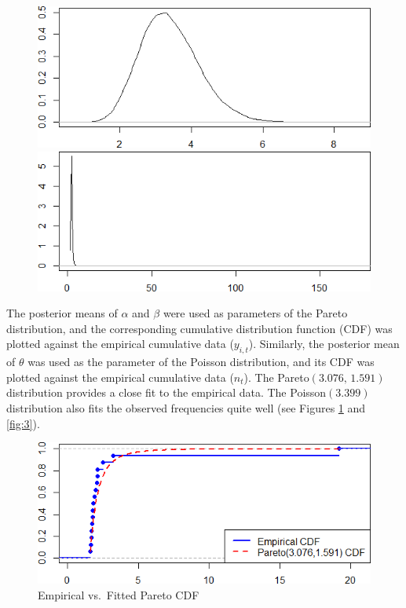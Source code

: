 \documentclass{Class/julia}
\begin{document}
\begin{figure}[!ht]
    \begin{minipage}{0.45\textwidth}
        \centering
        \includegraphics[width=\textwidth]{rytgaard1990/density_theta.png}
        \subcaption{\( \theta \)}
    \end{minipage}%
    \hfill
    \begin{minipage}{0.45\textwidth}
        \centering
        \includegraphics[width=\textwidth]{rytgaard1990/density_E_y.png}
    \end{minipage}
    
\end{figure}

The posterior means of \( \alpha \) and \( \beta \) were used as parameters of the Pareto distribution, and the corresponding cumulative distribution function (CDF) was plotted against the empirical cumulative data (\( y_{i,t} \)). Similarly, the posterior mean of \( \theta \) was used as the parameter of the Poisson distribution, and its CDF was plotted against the empirical cumulative data (\( n_t \)). The Pareto\((3.076,\,1.591)\) distribution provides a close fit to the empirical data. The Poisson\((3.399)\) distribution also fits the observed frequencies quite well (see Figures \ref{fig:2} and \ref{fig:3}).

\begin{figure}[!ht]
    \centering
    \caption{Empirical vs.\ Fitted Pareto CDF}
    \label{fig:2}
    \includegraphics[width=.75\textwidth]{rytgaard1990/empirical_vs_pareto.png}
\end{figure}
\end{document}
